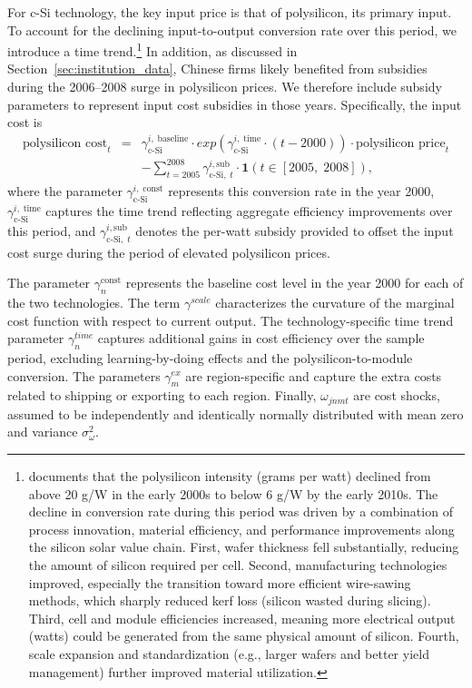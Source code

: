 \documentclass[12pt]{article}
\begin{document}
For c-Si technology, the key input price is that of polysilicon, its primary input.  To account for the declining input-to-output conversion rate over this period, we introduce a time trend.\footnote{\cite{BernreuterResearch2020} documents that the polysilicon intensity (grams per watt) declined from above 20 g/W in the early 2000s to below 6 g/W by the early 2010s. The decline in conversion rate during this period was driven by a combination of process innovation, material efficiency, and performance improvements along the silicon solar value chain. First, wafer thickness fell substantially, reducing the amount of silicon required per cell. Second, manufacturing technologies improved, especially the transition toward more efficient wire-sawing methods, which sharply reduced kerf loss (silicon wasted during slicing). Third, cell and module efficiencies increased, meaning more electrical output (watts) could be generated from the same physical amount of silicon. Fourth, scale expansion and standardization (e.g., larger wafers and better yield management) further improved material utilization.}  In addition, as discussed in Section~\ref{sec:institution_data}, Chinese firms likely benefited from subsidies during the 2006–2008 surge in polysilicon prices. We therefore include subsidy parameters to represent input cost subsidies in those years.
Specifically, the input cost is
\begin{eqnarray}
\text{polysilicon cost}_t & = & \gamma^{i,\;\text{baseline}}_{\text{c-Si}} \cdot exp(\gamma^{i,\;\text{time}}_{\text{c-Si}} \cdot (t-2000)) \cdot \text{polysilicon price}_{t} \nonumber \\
&&-\sum_{t=2005}^{2008} \gamma^{i,\text{sub}}_{\text{c-Si},\;t} \cdot \mathbf{1}(t \in [2005,\;2008]),
\end{eqnarray}
where the parameter $\gamma^{i,\;\text{const}}_{\text{c-Si}}$ represents this conversion rate in the year 2000, $\gamma^{i,\;\text{time}}_{\text{c-Si}}$ captures the time trend reflecting aggregate efficiency improvements over this period, and $\gamma^{i,\text{sub}}_{\text{c-Si},\;t}$ denotes the per-watt subsidy provided to offset the input cost surge during the period of elevated polysilicon prices.

The parameter $\gamma_{n}^{\text{const}}$ represents the baseline cost level in the year 2000 for each of the two technologies. The term $\gamma^{scale}$ characterizes the curvature of the marginal cost function with respect to current output. The technology-specific time trend parameter $\gamma^{time}_n$ captures additional gains in cost efficiency over the sample period, excluding learning-by-doing effects and the polysilicon-to-module conversion. The parameters $\gamma_{m}^{ex}$ are region-specific and capture the extra costs related to shipping or exporting to each region. Finally, $\omega_{jnmt}$ are cost shocks, assumed to be independently and identically normally distributed with mean zero and variance $\sigma_\omega^2$.
\end{document}
